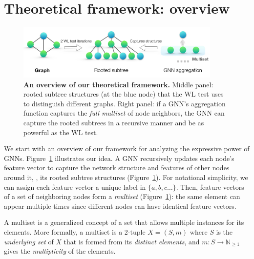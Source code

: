 
\vspace*{-5pt}

\section{Theoretical framework: overview} 
\label{sec:framework}

\begin{figure}[t]
 \vspace{-0.35in}
    \centering
        \includegraphics[width=0.9\textwidth]{frame.pdf} \vspace{-0.1in}
    \caption{{\bf An overview of our theoretical framework.} Middle panel: rooted subtree structures (at the blue node) that the WL test uses to distinguish different graphs. Right panel: if a GNN's aggregation function captures the \textit{full multiset} of node neighbors, the GNN can capture the rooted subtrees in a recursive manner and be as powerful as the WL test.}
\label{fig:wl-trees} \vspace{-0.00in}
\end{figure}

We start with an overview of our framework for analyzing the expressive power of GNNs. Figure~\ref{fig:wl-trees} illustrates our idea. A GNN recursively updates each node's feature vector to capture the network structure and features of other nodes around it, \ie, its rooted subtree structures (Figure~\ref{fig:wl-trees}). 
%
For notational simplicity, we can assign each feature vector a unique label in $\{a, b, c \ldots\}$. Then, feature vectors of a set of neighboring nodes form a \emph{multiset} (Figure~\ref{fig:wl-trees}): the same element can appear multiple times since different nodes can have identical feature vectors. 

\begin{definition}[Multiset] \label{def:multiset}
A multiset is a generalized concept of a set that allows multiple instances for its elements. More formally, a multiset is a 2-tuple $X = (S, m)$ where $S$ is the \textit{underlying set} of $X$ that is formed from its \textit{distinct elements}, and $m: S \rightarrow \mathbb{N}_{\geq 1}$ gives the \textit{multiplicity} of the elements. 
\end{definition} 

